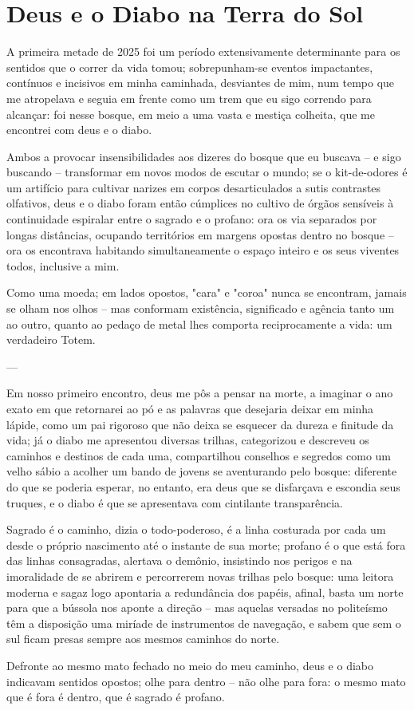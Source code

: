 \section{Deus e o Diabo na Terra do Sol}

A primeira metade de 2025 foi um período extensivamente determinante para os sentidos que o correr da vida tomou;
    sobrepunham-se eventos impactantes, contínuos e incisivos em minha caminhada, desviantes de mim, num tempo que me atropelava e seguia em frente como um trem que eu sigo correndo para alcançar:
        foi nesse bosque, em meio a uma vasta e mestiça colheita, que me encontrei com deus e o diabo.

Ambos a provocar insensibilidades aos dizeres do bosque que eu buscava -- e sigo buscando -- transformar em novos modos de escutar o mundo;
    se o kit-de-odores é um artifício para cultivar narizes em corpos desarticulados a sutis contrastes olfativos, deus e o diabo foram então cúmplices no cultivo de órgãos sensíveis à continuidade espiralar entre o sagrado e o profano:
        ora os via separados por longas distâncias, ocupando territórios em margens opostas dentro no bosque -- ora os encontrava habitando simultaneamente o espaço inteiro e os seus viventes todos, inclusive a mim.

Como uma moeda;
    em lados opostos, "cara" e "coroa" nunca se encontram, jamais se olham nos olhos -- mas conformam existência, significado e agência tanto um ao outro, quanto ao pedaço de metal lhes comporta reciprocamente a vida:
        um verdadeiro Totem.

---

Em nosso primeiro encontro, deus me pôs a pensar na morte, a imaginar o ano exato em que retornarei ao pó e as palavras que desejaria deixar em minha lápide, como um pai rigoroso que não deixa se esquecer da dureza e finitude da vida;
    já o diabo me apresentou diversas trilhas, categorizou e descreveu os caminhos e destinos de cada uma, compartilhou conselhos e segredos como um velho sábio a acolher um bando de jovens se aventurando pelo bosque:
        diferente do que se poderia esperar, no entanto, era deus que se disfarçava e escondia seus truques, e o diabo é que se apresentava com cintilante transparência.

Sagrado é o caminho, dizia o todo-poderoso, é a linha costurada por cada um desde o próprio nascimento até o instante de sua morte;
    profano é o que está fora das linhas consagradas, alertava o demônio, insistindo nos perigos e na imoralidade de se abrirem e percorrerem novas trilhas pelo bosque:
        uma leitora moderna e sagaz logo apontaria a redundância dos papéis, afinal, basta um norte para que a bússola nos aponte a direção -- mas aquelas versadas no politeísmo têm a disposição uma miríade de instrumentos de navegação, e sabem que sem o sul ficam presas sempre aos mesmos caminhos do norte.

Defronte ao mesmo mato fechado no meio do meu caminho, deus e o diabo indicavam sentidos opostos;
    olhe para dentro -- não olhe para fora:
        o mesmo mato que é fora é dentro, que é sagrado é profano.

